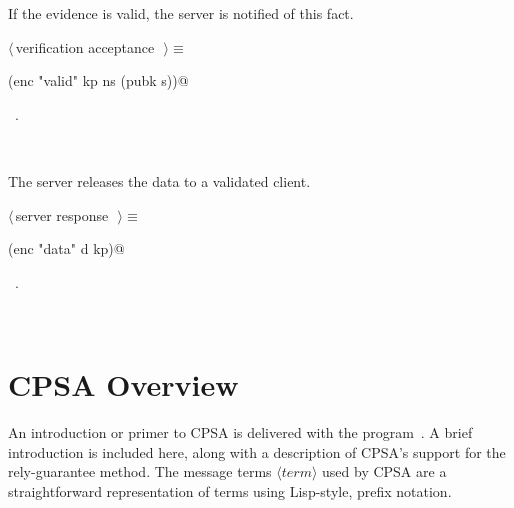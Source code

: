 \documentclass[titlepage,12pt]{article}
\theoremstyle{definition}
\newcommand{\nterm}[1]{\ensuremath{\langle\mathit{#1}\rangle}}
\begin{document}
\begin{description}
If the evidence is valid, the server is notified of this fact.
\begin{flushleft} \small
\begin{minipage}{\linewidth} \label{scrap11}
$\langle\,$verification acceptance\nobreak\ {\footnotesize {}}$\,\rangle\equiv$
\vspace{-1ex}
\begin{list}{}{} \item
\mbox{}\verb@(enc "valid" kp ns (pubk s))@{\NWsep}
\end{list}
\vspace{-1ex}
\footnotesize\addtolength{\baselineskip}{-1ex}
\begin{list}{}{\setlength{\itemsep}{-\parsep}\setlength{\itemindent}{-\leftmargin}}
\item \NWtxtMacroRefIn\ .
\end{list}
\end{minipage}\\[4ex]
\end{flushleft}
\item[$S\to C:\stocb\colon$]
The server releases the data to a validated client.
\begin{flushleft} \small
\begin{minipage}{\linewidth} \label{scrap12}
$\langle\,$server response\nobreak\ {\footnotesize {}}$\,\rangle\equiv$
\vspace{-1ex}
\begin{list}{}{} \item
\mbox{}\verb@(enc "data" d kp)@{\NWsep}
\end{list}
\vspace{-1ex}
\footnotesize\addtolength{\baselineskip}{-1ex}
\begin{list}{}{\setlength{\itemsep}{-\parsep}\setlength{\itemindent}{-\leftmargin}}
\item \NWtxtMacroRefIn\ .
\end{list}
\end{minipage}\\[4ex]
\end{flushleft}
\end{description}

\section{CPSA Overview}
An introduction or primer to CPSA is delivered with the
program~\cite{RamsdellGuttman09}.  A brief introduction is included
here, along with a description of CPSA's support for the
rely-guarantee method.  The message terms \nterm{term} used by CPSA
are a straightforward representation of terms using Lisp-style, prefix
notation.
\end{document}

